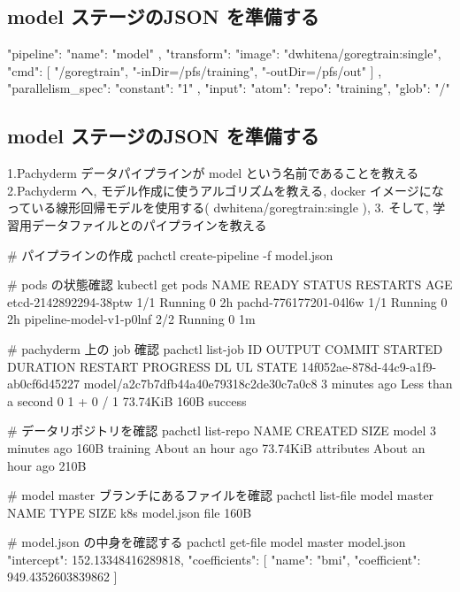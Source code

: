 \documentclass[mingoth,a4paper]{jsarticle}
\begin{document}
\subsection{model ステージのJSON を準備する}

\begin{commandline}
{
  "pipeline": {
    "name": "model"
  },
  "transform": {
    "image": "dwhitena/goregtrain:single",
    "cmd": [
      "/goregtrain",
      "-inDir=/pfs/training",
      "-outDir=/pfs/out"
    ]
  },
  "parallelism_spec": {
    "constant": "1"
  },
  "input": {
    "atom": {
      "repo": "training",
      "glob": "/"
    }
  }
}
\end{commandline}

\subsection{model ステージのJSON を準備する}

1.Pachyderm データパイプラインが model という名前であることを教える
2.Pachyderm へ, モデル作成に使うアルゴリズムを教える, docker イメージになっている線形回帰モデルを使用する( dwhitena/goregtrain:single ),
3. そして, 学習用データファイルとのパイプラインを教える

\begin{commandline}
# パイプラインの作成
pachctl create-pipeline -f model.json

# pods の状態確認
kubectl get pods
NAME READY STATUS RESTARTS AGE
etcd-2142892294-38ptw 1/1 Running 0 2h
pachd-776177201-04l6w 1/1 Running 0 2h
pipeline-model-v1-p0lnf 2/2 Running 0 1m

# pachyderm 上の job 確認
pachctl list-job
ID OUTPUT COMMIT STARTED DURATION RESTART PROGRESS DL UL STATE
14f052ae-878d-44c9-a1f9-ab0cf6d45227 model/a2c7b7dfb44a40e79318c2de30c7a0c8
3 minutes ago Less than a second 0 1 + 0 / 1 73.74KiB 160B success

# データリポジトリを確認
pachctl list-repo
NAME CREATED SIZE
model 3 minutes ago 160B
training About an hour ago 73.74KiB
attributes About an hour ago 210B

# model master ブランチにあるファイルを確認
pachctl list-file model master
NAME TYPE SIZE k8s
model.json file 160B

# model.json の中身を確認する
pachctl get-file model master model.json
{
  "intercept": 152.13348416289818,
  "coefficients": [
    {
      "name": "bmi",
      "coefficient": 949.4352603839862
    }
  ]
}
\end{commandline}
\end{document}

